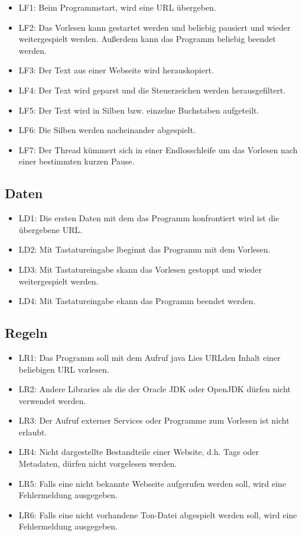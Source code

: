 \documentclass[12pt]{scrartcl}
\begin{document}
\begin{itemize}
	\item LF1: Beim Programmstart, wird eine URL übergeben.
	\item LF2: Das Vorlesen kann gestartet werden und beliebig pausiert und wieder weitergespielt werden. Außerdem
	kann das Programm beliebig beendet werden.
	\item LF3: Der Text aus einer Webseite wird herauskopiert.
	\item LF4: Der Text wird geparst und die Steuerzeichen werden herausgefiltert.
	\item LF5: Der Text wird in Silben bzw. einzelne Buchstaben aufgeteilt.
	\item LF6: Die Silben werden nacheinander abgespielt.
	\item LF7: Der Thread kümmert sich in einer Endlosschleife um das Vorlesen nach einer bestimmten kurzen Pause.
\end{itemize}

\subsection{Daten}

\begin{itemize}
	\item LD1: Die ersten Daten mit dem das Programm konfrontiert wird ist die übergebene URL.
	\item LD2: Mit Tastatureingabe \glqq l\grqq beginnt das Programm mit dem Vorlesen.
	\item LD3: Mit Tastatureingabe \glqq s\grqq kann das Vorlesen gestoppt und wieder weitergespielt werden.
	\item LD4: Mit Tastatureingabe \glqq e\grqq kann das Programm beendet werden.
	
\end{itemize}


\subsection{Regeln}

\begin{itemize}
	\item LR1: Das Programm soll mit dem Aufruf java Lies \glqq URL\grqq den Inhalt einer beliebigen URL vorlesen.
	\item LR2: Andere Libraries als die der Oracle JDK oder OpenJDK dürfen nicht verwendet werden.
	\item LR3: Der Aufruf externer Services oder Programme zum Vorlesen ist nicht erlaubt.
	\item LR4: Nicht dargestellte Bestandteile einer Website, d.h. Tags oder Metadaten, dürfen nicht vorgelesen werden.
	\item LR5: Falls eine nicht bekannte Webseite aufgerufen werden soll, wird eine Fehlermeldung ausgegeben.
	\item LR6: Falls eine nicht vorhandene Ton-Datei abgespielt werden soll, wird eine Fehlermeldung ausgegeben.
\end{itemize}
\end{document}

